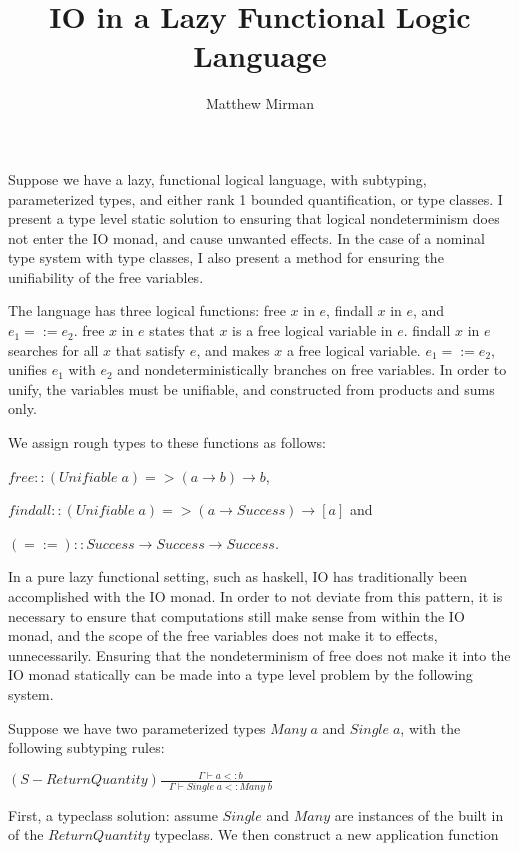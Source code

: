 \documentclass[english]{article}
\newcommand{\judges}{ \; \; \; \Gamma \vdash}
\begin{document}
\title{IO in a Lazy Functional Logic Language} \author{Matthew Mirman}
\maketitle

Suppose we have a lazy, functional logical language, with subtyping, parameterized types, and either rank 1 bounded quantification, or
type classes. I present a type level static solution to ensuring that logical nondeterminism does not enter the IO monad, and cause
unwanted effects.  In the case of a nominal type system with type classes, I also present a method for ensuring the unifiability of 
the free variables.

The language has three logical functions:  free $x$ in $e$, findall $x$ in $e$, and $e_1 =:= e_2$. 
free $x$ in $e$ states that $x$ is a free logical variable in $e$.  findall $x$ in $e$ searches for all $x$ that satisfy $e$, and makes $x$ a free logical variable. 
$e_1 =:= e_2$,  unifies $e_1$ with $e_2$ and nondeterministically branches on free variables.
In order to unify, the variables must be unifiable, and constructed from products and sums only.

We assign rough types to these functions as follows:

$free :: (Unifiable \; a) => (a \rightarrow b) \rightarrow b $,

$findall :: (Unifiable \; a) => (a \rightarrow Success) \rightarrow [a]$  and 

$(=:=) :: Success \rightarrow Success \rightarrow Success$.

In a pure lazy functional setting, such as haskell, IO has traditionally been accomplished with the IO monad.  
In order to not deviate from this pattern, it is necessary to ensure that computations still make sense from within the IO monad, and the scope of the free variables
does not make it to effects, unnecessarily.  Ensuring that the nondeterminism of free does not make it into the IO monad statically can be made into a type level problem
by the following system. 

Suppose we have two parameterized types $Many \; a$ and $Single \; a$, with the following subtyping rules:

$(S-ReturnQuantity)\frac{
   \judges a <: b
}{
   \judges Single \; a <: Many \; b 
}$

First, a typeclass solution: assume $Single$ and $Many$ are instances of the built in of the $ReturnQuantity$ typeclass.
We then construct a new application function 
\end{document}
